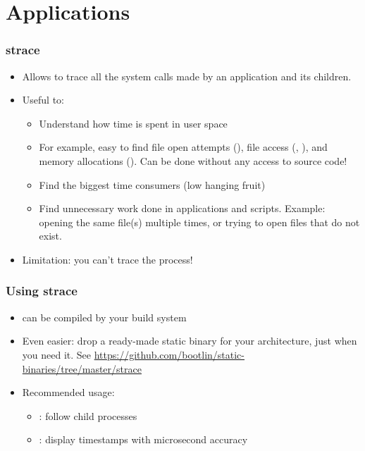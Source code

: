\section{Applications}

\begin{frame}
\frametitle{strace}
\begin{itemize}
	\item Allows to trace all the system calls made by an
              application and its children.
	\item Useful to:
	\begin{itemize}
		\item Understand how time is spent in user space
 		\item For example, easy to find file open attempts (),
		      file access (, ), and
		      memory allocations (). Can be done
		      without any access to source code!
		\item Find the biggest time consumers
 		      (low hanging fruit)
  		\item Find unnecessary work done in applications
		      and scripts. Example: opening the same file(s)
		      multiple times, or trying to open files that
		      do not exist.
	\end{itemize}
	\item Limitation: you can't trace the  process!
\end{itemize}
\end{frame}

\begin{frame}
\frametitle{Using strace}
\begin{itemize}
	\item {} can be compiled by your build system
	\item Even easier: drop a ready-made static binary for your
	      architecture, just when you need it. See
	      \url{https://github.com/bootlin/static-binaries/tree/master/strace}
	\item Recommended usage: \\
        \begin{itemize}
	      \item {}: follow child processes
	      \item {}: display timestamps with microsecond accuracy
	\end{itemize}
\end{itemize}
\end{frame}

